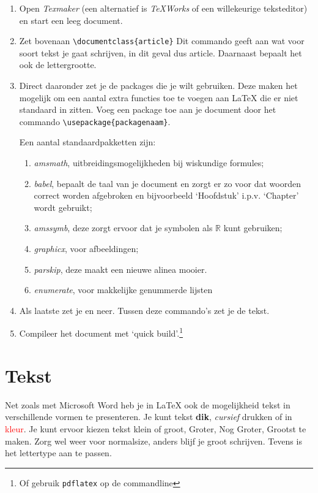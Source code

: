 \begin{enumerate}
	\item Open \emph{Texmaker} (een alternatief is \emph{TeXWorks} of een willekeurige teksteditor) en start een leeg document.

	\item Zet bovenaan \verb.\documentclass{article}. Dit commando geeft aan wat
	voor soort tekst je gaat schrijven, in dit geval dus article. Daarnaast
	bepaalt het ook de lettergrootte.

	\item Direct daaronder zet je de packages die je wilt gebruiken. Deze maken
	het mogelijk om een aantal extra functies toe te voegen aan \LaTeX{} die er
	niet standaard in zitten. Voeg een package toe aan je document door het
	commando \verb|\usepackage{packagenaam}|.

	Een aantal standaardpakketten zijn:
	\begin{enumerate}[1)] %
		\item \emph{amsmath}, uitbreidingsmogelijkheden bij wiskundige formules;
		\item \emph{babel}, bepaalt de taal van je document en zorgt er zo voor
		dat woorden correct worden afgebroken en bijvoorbeeld `Hoofdstuk' i.p.v.
		`Chapter' wordt gebruikt;
		\item \emph{amssymb}, deze zorgt ervoor dat je symbolen als
		\(\mathbb{R}\) kunt gebruiken;
		\item \emph{graphicx}, voor afbeeldingen;
		\item \emph{parskip}, deze maakt een nieuwe alinea mooier.
		\item \emph{enumerate}, voor makkelijke genummerde lijsten
	\end{enumerate}

	\item Als laatste zet je \verb.. en \verb..
	neer. Tussen deze commando's zet je de tekst.

	\item Compileer het document met `quick build'.\footnote{Of gebruik \texttt{pdflatex} op de commandline}

\end{enumerate}

\section{Tekst}
Net zoals met Microsoft Word heb je in \LaTeX{} ook de mogelijkheid tekst in
verschillende vormen te presenteren. Je kunt tekst \textbf{dik},
\textit{cursief} drukken of in \textcolor{red}{kleur}. Je kunt ervoor kiezen
tekst \small klein of \large groot, \Large Groter, \huge Nog Groter, \Huge
Grootst te maken. Zorg wel weer voor \normalsize normalsize, anders blijf je
groot schrijven. Tevens is het lettertype aan te passen.

